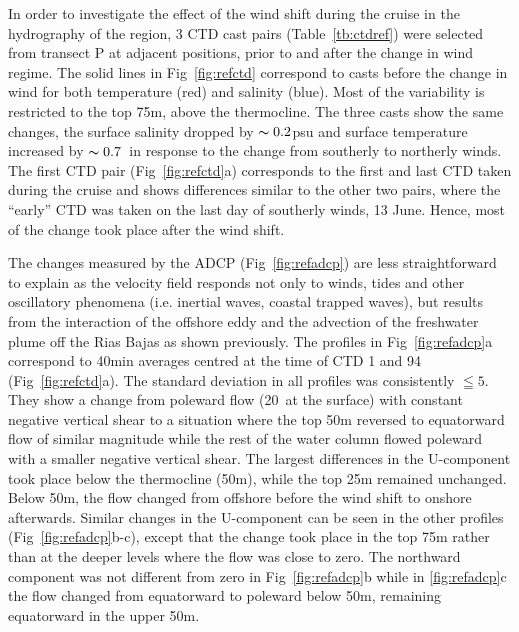 In order to investigate the effect of the wind shift during the
cruise in the hydrography of the region, 3 CTD cast pairs
(Table~\ref{tb:ctdref}) were selected from transect P at adjacent
positions, prior to and after the change in wind regime. The solid
lines in Fig~\ref{fig:refctd} correspond to casts before the
change in wind for both temperature (red) and salinity (blue).
Most of the variability is restricted to the top 75m, above the
thermocline. The three casts show the same changes, the surface
salinity dropped by $\thicksim 0.2$psu and surface temperature
increased by $\thicksim 0.7$\deg\, in response to the change from
southerly to northerly winds. The first CTD pair
(Fig~\ref{fig:refctd}a) corresponds to the first and last CTD
taken during the cruise and shows  differences similar to the
other two pairs, where the ``early'' CTD was taken on the last day
of southerly winds, 13 June. Hence, most of the change took place
after the wind shift.

The changes measured by the ADCP (Fig~\ref{fig:refadcp}) are less
straightforward to explain as the velocity field responds not only
to winds, tides and other oscillatory phenomena (i.e. inertial
waves, coastal trapped waves), but results from the interaction of
the offshore eddy and the advection of the freshwater plume off
the Rias Bajas as shown previously. The profiles in
Fig~\ref{fig:refadcp}a correspond to 40min averages centred at the
time of CTD 1 and 94 (Fig~\ref{fig:refctd}a). The standard
deviation in all profiles was consistently $\leqq 5$\velc. They
show a change from poleward flow (20\velc\, at the surface) with
constant negative vertical shear to a situation where the top 50m
reversed to equatorward flow of similar magnitude while the rest
of the water column flowed poleward with a smaller negative
vertical shear. The largest differences in the U-component took
place below the thermocline (50m), while the top 25m remained
unchanged. Below 50m, the flow changed from offshore before the
wind shift to onshore afterwards. Similar changes in the
U-component can be seen in the other profiles
(Fig~\ref{fig:refadcp}b-c), except that the change took place in
the top 75m rather than at the deeper levels where the flow was
close to zero. The northward component was not different from zero
in Fig~\ref{fig:refadcp}b while in \ref{fig:refadcp}c the flow
changed from equatorward to poleward below 50m, remaining
equatorward in the upper 50m.

